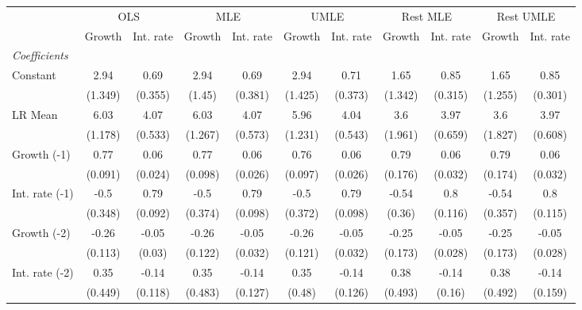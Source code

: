 \begin{table}[htbp] 
	\centering
	\begin{tabular}{@{\extracolsep{4pt}}lcccccccccc@{}}		\hline\hline
		 		 & \multicolumn{2}{c}{OLS} &\multicolumn{2}{c}{MLE} &\multicolumn{2}{c}{UMLE} &\multicolumn{2}{c}{Rest MLE} &\multicolumn{2}{c}{Rest UMLE} \\ 
 		 & Growth 	 & Int. rate 	 & Growth 	 & Int. rate 	 & Growth 	 & Int. rate 	 & Growth 	 & Int. rate 	 & Growth 	 & Int. rate\\\cline{2-3}\cline{4-5}\cline{6-7}\cline{8-9}\cline{10-11}
\rule{0pt}{4ex} 
 \emph{Coefficients} 	  		 & 		 & 		 & 		 & 		 & 		 & 		 & 		 & 		 & 		 &\\ 
\quad Constant 	 & 2.94 	 & 0.69 	 & 2.94 	 & 0.69 	 & 2.94 	 & 0.71 	 & 1.65 	 & 0.85 	 & 1.65 	 & 0.85	 \\ 
 		 & (1.349) 	 & (0.355) 	 & (1.45) 	 & (0.381) 	 & (1.425) 	 & (0.373) 	 & (1.342) 	 & (0.315) 	 & (1.255) 	 & (0.301) 	 \\ 
\quad LR Mean 	 & 6.03 	 & 4.07 	 & 6.03 	 & 4.07 	 & 5.96 	 & 4.04 	 & 3.6 	 & 3.97 	 & 3.6 	 & 3.97	 \\ 
 		 & (1.178) 	 & (0.533) 	 & (1.267) 	 & (0.573) 	 & (1.231) 	 & (0.543) 	 & (1.961) 	 & (0.659) 	 & (1.827) 	 & (0.608) 	 \\ 
\quad Growth (-1) 	 &0.77 	 & 0.06 	 & 0.77 	 & 0.06 	 & 0.76 	 & 0.06 	 & 0.79 	 & 0.06 	 & 0.79 	 & 0.06	 \\ 
 		 & (0.091) 	 & (0.024) 	 & (0.098) 	 & (0.026) 	 & (0.097) 	 & (0.026) 	 & (0.176) 	 & (0.032) 	 & (0.174) 	 & (0.032) 	 \\ 
\quad Int. rate (-1) 	 &-0.5 	 & 0.79 	 & -0.5 	 & 0.79 	 & -0.5 	 & 0.79 	 & -0.54 	 & 0.8 	 & -0.54 	 & 0.8	 \\ 
 		 & (0.348) 	 & (0.092) 	 & (0.374) 	 & (0.098) 	 & (0.372) 	 & (0.098) 	 & (0.36) 	 & (0.116) 	 & (0.357) 	 & (0.115) 	 \\ 
\quad Growth (-2) 	 &-0.26 	 & -0.05 	 & -0.26 	 & -0.05 	 & -0.26 	 & -0.05 	 & -0.25 	 & -0.05 	 & -0.25 	 & -0.05	 \\ 
 		 & (0.113) 	 & (0.03) 	 & (0.122) 	 & (0.032) 	 & (0.121) 	 & (0.032) 	 & (0.173) 	 & (0.028) 	 & (0.173) 	 & (0.028) 	 \\ 
\quad Int. rate (-2) 	 &0.35 	 & -0.14 	 & 0.35 	 & -0.14 	 & 0.35 	 & -0.14 	 & 0.38 	 & -0.14 	 & 0.38 	 & -0.14	 \\ 
 		 & (0.449) 	 & (0.118) 	 & (0.483) 	 & (0.127) 	 & (0.48) 	 & (0.126) 	 & (0.493) 	 & (0.16) 	 & (0.492) 	 & (0.159) 	 \\ 

\end{tabular}
\end{table}
